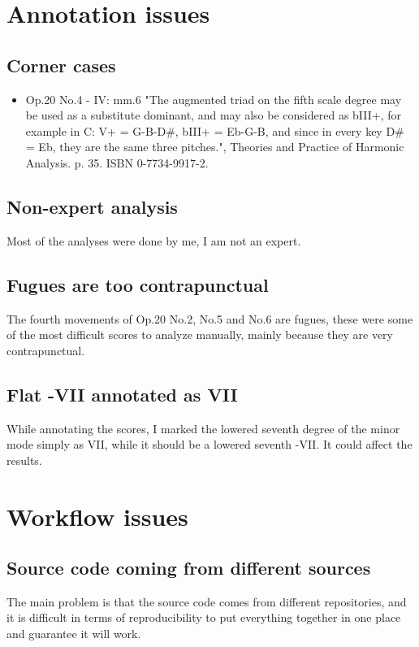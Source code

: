 	\section{Annotation issues}
    \subsection{Corner cases}
      \begin{itemize}
        \item Op.20 No.4 - IV: mm.6 "The augmented triad on the fifth scale degree may be used as a substitute dominant, and may also be considered as bIII+, for example in C: V+ = G-B-D\#, bIII+ = Eb-G-B, and since in every key D\# = Eb, they are the same three pitches.", Theories and Practice of Harmonic Analysis. p. 35. ISBN 0-7734-9917-2.
      \end{itemize}
		\subsection{Non-expert analysis}
    Most of the analyses were done by me, I am not an expert.
		\subsection{Fugues are too contrapunctual}
    The fourth movements of Op.20 No.2, No.5 and No.6 are fugues, these were some of the most difficult scores to analyze manually, mainly because they are very contrapunctual.
		\subsection{Flat -VII annotated as VII}
    While annotating the scores, I marked the lowered seventh degree of the minor mode simply as VII, while it should be a lowered seventh -VII. It could affect the results.
	\section{Workflow issues}
		\subsection{Source code coming from different sources}
    The main problem is that the source code comes from different repositories, and it is difficult in terms of reproducibility to put everything together in one place and guarantee it will work.
